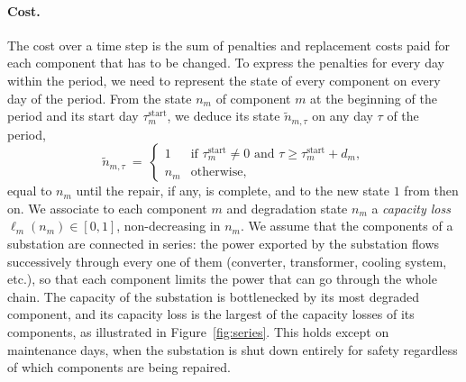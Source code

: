 \documentclass{article}
\begin{document}
\paragraph{Cost.} The cost over a time step is the sum of penalties and replacement costs paid for each component that
has to be changed. To express the penalties for every day within the period, we need to represent the state of every component 
on every day of the period. From the state $n_m$ of component $m$ at the beginning of the period and its start day
$\tau^{\text{start}}_m$, we deduce its state $\tilde{n}_{m,\tau}$ on any day $\tau$ of the period,
\[
\tilde{n}_{m,\tau} \ =\
\begin{cases}
1 & \text{if } \tau^{\text{start}}_m \neq 0 \text{ and } \tau \ge \tau^{\text{start}}_m + d_m, \\
n_m & \text{otherwise},
\end{cases}
\]
equal to $n_m$ until the repair, if any, is complete, and to the new state $1$ from then on. We associate to each
component $m$ and degradation state $n_m$ a \emph{capacity loss} $\ell_m(n_m) \in [0,1]$, non-decreasing in $n_m$.
We assume that the components of a substation are connected in series: the power exported by the substation flows
successively through every one of them (converter, transformer, cooling system, etc.), so that each component limits
the power that can go through the whole chain. The capacity of the substation is bottlenecked by its most degraded
component, and its capacity loss is the largest of the capacity losses of its components, as illustrated in
Figure~\ref{fig:series}. This holds except on
maintenance days, when the substation is shut down entirely for safety regardless of which components are being
repaired.
\end{document}
